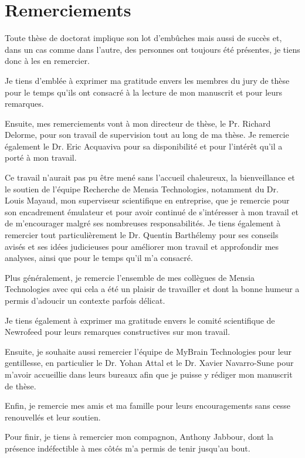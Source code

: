 \chapter*{Remerciements}

Toute thèse de doctorat implique son lot d'embûches mais aussi de succès et, dans un cas comme dans l'autre, des personnes ont toujours 
été présentes, je tiens donc à les en remercier. 

Je tiens d'emblée à exprimer ma gratitude envers les membres du jury de thèse pour le temps qu'ils ont consacré à la lecture de mon manuscrit et pour leurs 
remarques.

Ensuite, mes remerciements vont à mon directeur de thèse, le Pr. Richard Delorme, pour son travail de supervision tout au long
de ma thèse. Je remercie également le Dr. Eric Acquaviva pour sa disponibilité et pour l'intérêt qu'il a porté à mon travail. 

Ce travail n'aurait pas pu être mené sans l'accueil chaleureux, la bienveillance et le soutien de l'équipe Recherche de Mensia Technologies, notamment  
du Dr. Louis Mayaud, mon superviseur scientifique en entreprise, que je remercie pour son encadrement émulateur et 
pour avoir continué de s'intéresser à mon travail et de m'encourager malgré ses nombreuses
responsabilités. Je tiens également à remercier tout particulièrement le Dr. Quentin Barthélemy pour ses conseils 
avisés et ses idées judicieuses pour améliorer mon travail et approfondir mes analyses, ainsi que pour le temps qu'il m'a consacré. 

Plus généralement, je remercie l'ensemble de mes collègues de Mensia Technologies avec qui cela a été un plaisir de travailler et dont la bonne 
humeur a permis d'adoucir un contexte parfois délicat.

Je tiens également à exprimer ma gratitude envers le comité scientifique de Newrofeed pour leurs remarques constructives sur mon travail. 

Ensuite, je souhaite aussi remercier l'équipe de MyBrain Technologies pour leur gentillesse, en particulier le Dr. Yohan Attal et le Dr. Xavier Navarro-Sune 
pour m'avoir accueillie dans leurs bureaux afin que je puisse y rédiger mon manuscrit de thèse. 

Enfin, je remercie mes amis et ma famille pour leurs encouragements sans cesse renouvellés et leur soutien.

Pour finir, je tiens à remercier mon compagnon, Anthony Jabbour, dont la présence indéfectible à mes côtés m'a permis de tenir jusqu'au bout.     
